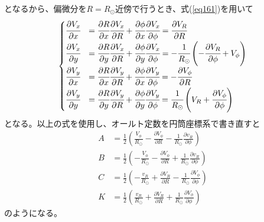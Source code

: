 となるから、偏微分を$R=R_{\odot}$近傍で行うとき、式(\ref{eq161})を用いて
\begin{align}
\begin{cases}
	\cfrac{\partial V_x}{\partial x} &= \cfrac{\partial R}{\partial x}\cfrac{\partial V_x}{\partial R} + \cfrac{\partial \phi}{\partial x}\cfrac{\partial V_x}{\partial \phi} = \cfrac{\partial V_R}{\partial R} \\[2mm]
	\cfrac{\partial V_x}{\partial y} &= \cfrac{\partial R}{\partial y}\cfrac{\partial V_x}{\partial R} + \cfrac{\partial \phi}{\partial y}\cfrac{\partial V_x}{\partial \phi} = -\cfrac{1}{R_{\odot}}\left(-\cfrac{\partial V_R}{\partial \phi} + V_{\phi}\right)\\[2mm]
	\cfrac{\partial V_y}{\partial x} &= \cfrac{\partial R}{\partial x}\cfrac{\partial V_y}{\partial R} + \cfrac{\partial \phi}{\partial x}\cfrac{\partial V_y}{\partial \phi} = -\cfrac{\partial V_{\phi}}{\partial R}\\[2mm]
	\cfrac{\partial V_y}{\partial y} &= \cfrac{\partial R}{\partial y}\cfrac{\partial V_y}{\partial R} + \cfrac{\partial \phi}{\partial y}\cfrac{\partial V_y}{\partial \phi} = \cfrac{1}{R_{\odot}}\left(V_R + \cfrac{\partial V_{\phi}}{\partial \phi}\right)
\end{cases}
\end{align}
となる。以上の式を使用し、オールト定数を円筒座標系で書き直すと
\begin{subequations}
\begin{align}
	A &=\frac{1}{2}\left( \frac{V_{\phi}}{R_{\odot}} - \frac{\partial V_{\phi}}{\partial R} - \frac{1}{R_{\odot}}\frac{\partial v_{R}}{\partial \phi} \right) \label{eq2.5a}\\
	B &=\frac{1}{2}\left( -\frac{V_{\phi}}{R_{\odot}} - \frac{\partial V_{\phi}}{\partial R} + \frac{1}{R_{\odot}}\frac{\partial v_{R}}{\partial \phi} \right) \label{eq2.5b}\\
	C &=\frac{1}{2}\left( -\frac{v_{R}}{R_{\odot}} + \frac{\partial V_R}{\partial R} - \frac{1}{R_{\odot}}\frac{\partial V_{\phi}}{\partial \phi} \right) \label{eq2.5c}\\
	K &=\frac{1}{2}\left( \frac{v_{R}}{R_{\odot}} + \frac{\partial V_R}{\partial R} + \frac{1}{R_{\odot}}\frac{\partial V_{\phi}}{\partial \phi} \right) \label{eq2.5d}
\end{align} \label{eq2.5}
\end{subequations}
のようになる。


